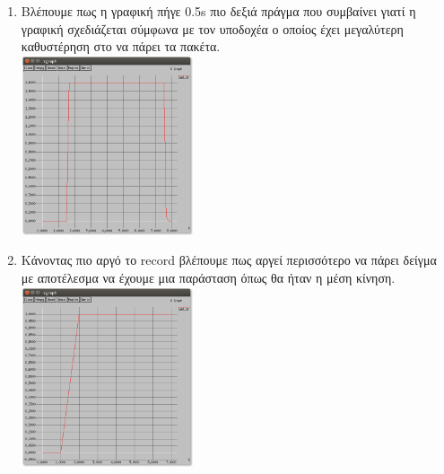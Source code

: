 \documentclass{article}
\begin{document}
\begin{enumerate}
\item
Βλέπουμε πως η γραφική πήγε 0.5s πιο δεξιά πράγμα που συμβαίνει γιατί η γραφική σχεδιάζεται σύμφωνα με τον υποδοχέα ο οποίος έχει μεγαλύτερη καθυστέρηση στο να πάρει τα πακέτα.
\\
\includegraphics[witdh=200,height=200]{xgraphms.png}
\item
Κάνοντας πιο αργό το record βλέπουμε πως αργεί περισσότερο να πάρει δείγμα με αποτέλεσμα να έχουμε μια  παράσταση όπως θα ήταν η μέση κίνηση.\\ \includegraphics[witdh=200,height=200]{1s.png} \\

\end{enumerate}
\end{document}
